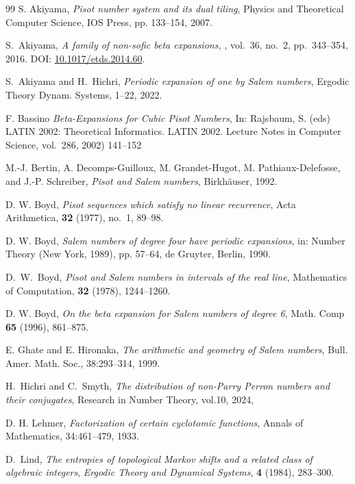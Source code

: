 \documentclass[12pt]{article}
\theoremstyle{plain}
\theoremstyle{remark}
\begin{document}
\begin{thebibliography}{99}
 S. Akiyama, \emph{Pisot number system and its dual tiling}, Physics and Theoretical Computer Science, IOS Press, pp. 133--154, 2007.

 S.~Akiyama,
\newblock \emph{A family of non-sofic beta expansions,}
, vol.~36, no.~2, pp.~343--354, 2016.
\newblock DOI: \href{https://doi.org/10.1017/etds.2014.60}{10.1017/etds.2014.60}.

 S.~Akiyama and H.~Hichri, \emph{Periodic expansion of one by Salem numbers}, Ergodic Theory Dynam. Systems, 1--22, 2022.

F. Bassino \emph{Beta-Expansions for Cubic Pisot Numbers}, In: Rajsbaum, S. (eds) LATIN 2002: Theoretical Informatics. LATIN 2002. Lecture Notes in Computer Science, vol.~286, 2002) 141--152

 M.-J. Bertin, A. Decomps-Guilloux, M. Grandet-Hugot, M. Pathiaux-Delefosse, and J.-P. Schreiber, \emph{Pisot and Salem numbers}, Birkhäuser, 1992.

D. W. Boyd, \emph{Pisot sequences which satisfy no linear recurrence},
Acta Arithmetica, \textbf{32} (1977), no.~1, 89--98.

 D. W. Boyd, \emph{Salem numbers of degree four have periodic expansions}, in: Number Theory (New York, 1989), pp. 57--64, de Gruyter, Berlin, 1990.

D.~W.~Boyd, \emph{Pisot and Salem numbers in intervals of the real line}, 
Mathematics of Computation, \textbf{32} (1978), 1244--1260.

D. W. Boyd, \emph{On the beta expansion for {S}alem numbers of degree 6}, Math.
 Comp \textbf{65} (1996), 861--875.

 E. Ghate and E. Hironaka, \emph{The arithmetic and geometry of Salem numbers}, Bull. Amer. Math. Soc., 38:293--314, 1999.

 H.~Hichri and C.~Smyth,
\emph{The distribution of non-Parry Perron numbers and their conjugates},
Research in Number Theory, vol.10, 2024,

 D. H. Lehmer, \emph{Factorization of certain cyclotomic functions}, Annals of Mathematics, 34:461--479, 1933.

D.~Lind,
\textit{The entropies of topological Markov shifts and a related class of algebraic integers},
\emph{Ergodic Theory and Dynamical Systems}, \textbf{4} (1984), 283--300.


\end{thebibliography}
\end{document}
